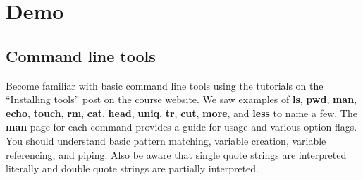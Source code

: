 \section{Demo}
\subsection{Command line tools}
Become familiar with basic command line tools using the tutorials on the ``Installing tools'' post on the course website. We saw examples of \textbf{ls}, \textbf{pwd}, \textbf{man}, \textbf{echo}, \textbf{touch}, \textbf{rm}, \textbf{cat}, \textbf{head}, \textbf{uniq}, \textbf{tr}, \textbf{cut}, \textbf{more}, and \textbf{less} to name a few. The \textbf{man} page for each command provides a guide for usage and various option flags. You should understand basic pattern matching, variable creation, variable referencing, and piping. Also be aware that single quote strings are interpreted literally and double quote strings are partially interpreted.
